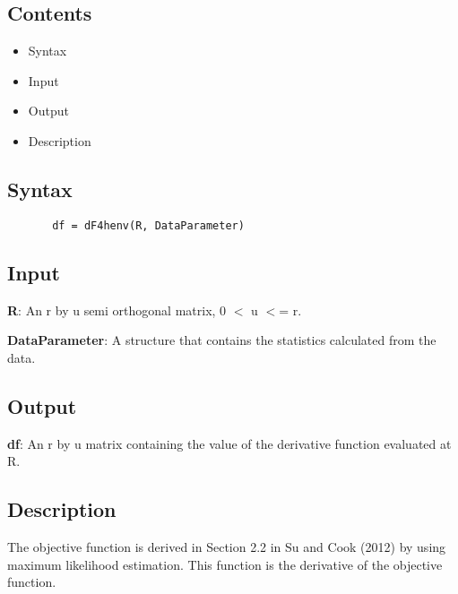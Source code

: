 \documentclass[a4paper,11pt,openany]{memoir}
\begin{document}
\subsection*{Contents}

\begin{itemize}
\setlength{\itemsep}{-1ex}
   \item Syntax
   \item Input
   \item Output
   \item Description
\end{itemize}


\subsection*{Syntax}


\begin{verbatim}       df = dF4henv(R, DataParameter)\end{verbatim}
    

\subsection*{Input}

\begin{par}
\textbf{R}: An r by u semi orthogonal matrix, 0 \ensuremath{<} u \ensuremath{<}= r.
\end{par} \vspace{1em}
\begin{par}
\textbf{DataParameter}: A structure that contains the statistics calculated from the data.
\end{par} \vspace{1em}


\subsection*{Output}

\begin{par}
\textbf{df}: An r by u matrix containing the value of the derivative function evaluated at R.
\end{par} \vspace{1em}


\subsection*{Description}

\begin{par}
The objective function is derived in Section 2.2 in Su and Cook (2012) by  using maximum likelihood estimation. This function is the derivative of  the objective function.
\end{par} \vspace{1em}
\end{document}
